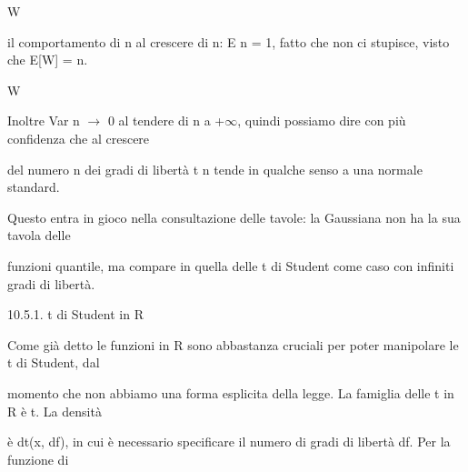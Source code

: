\documentclass[a4paper,portrait,12pt]{article}
\begin{document}
\begin{flushleft}
W
\end{flushleft}


\begin{flushleft}
il comportamento di n al crescere di n: E n = 1, fatto che non ci stupisce, visto che E[W] = n.
\end{flushleft}


\begin{flushleft}
W
\end{flushleft}


\begin{flushleft}
Inoltre Var n $\rightarrow$ 0 al tendere di n a +$\infty$, quindi possiamo dire con più confidenza che al crescere
\end{flushleft}


\begin{flushleft}
del numero n dei gradi di libert\`{a} t n tende in qualche senso a una normale standard.
\end{flushleft}


\begin{flushleft}
Questo entra in gioco nella consultazione delle tavole: la Gaussiana non ha la sua tavola delle
\end{flushleft}


\begin{flushleft}
funzioni quantile, ma compare in quella delle t di Student come caso con infiniti gradi di libert\`{a}.
\end{flushleft}





\begin{flushleft}
10.5.1. t di Student in R
\end{flushleft}


\begin{flushleft}
Come gi\`{a} detto le funzioni in R sono abbastanza cruciali per poter manipolare le t di Student, dal
\end{flushleft}


\begin{flushleft}
momento che non abbiamo una forma esplicita della legge. La famiglia delle t in R \`{e} t. La densit\`{a}
\end{flushleft}


\begin{flushleft}
\`{e} dt(x, df), in cui \`{e} necessario specificare il numero di gradi di libert\`{a} df. Per la funzione di
\end{flushleft}
\end{document}
